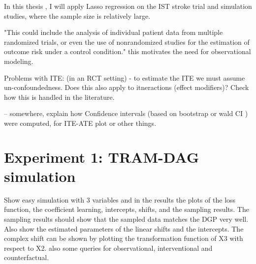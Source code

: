 In this thesis , I will apply Lasso regression on the IST stroke trial and simulation studies, where the sample size is relatively large.


 
 "This could include the analysis of individual patient data from multiple randomized trials, or even the use of nonrandomized studies for the estimation of outcome risk under a control condition." this motivates the need for observational modeling.


Problems with ITE: (in an RCT setting)
- to estimate the ITE we must assume un-confoundedness. Does this also apply to itneractions (effect modifiers)? Check how this is handled in the literature.



-- somewhere, explain how Confidence intervals (based on bootstrap or wald CI ) were computed, for ITE-ATE plot or other things.




\section{Experiment 1: TRAM-DAG simulation}

Show easy simulation with 3 variables and in the results the plots of the loss function, the coefficient learning, intercepts, shifts, and the sampling results. The sampling results should show that the sampled data matches the DGP very well. Also show the estimated parameters of the linear shifts and the intercepts. The complex shift can be shown by plotting the transformation function of X3 with respect to X2. also some queries for observational, interventional and counterfactual.

